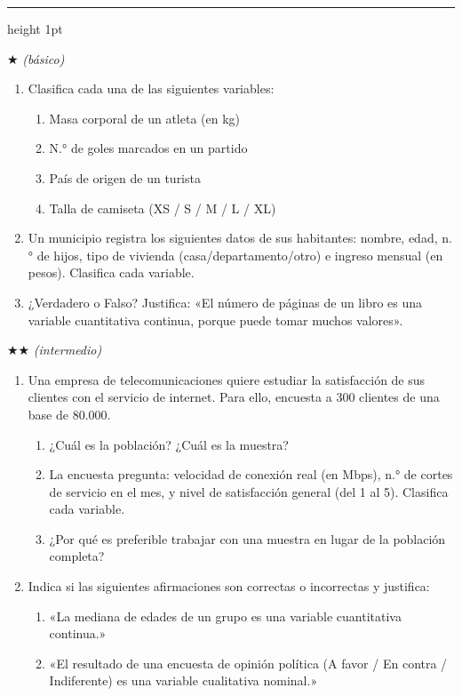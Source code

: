 \documentclass[11pt, letterpaper]{article}
\newcommand{\subbloque}[1]{%
  \vspace{14pt}
  \noindent{\large\bfseries\color{zenitnavy} #1}\par
  \vspace{4pt}\hrule height 1pt\vspace{8pt}}
\begin{document}
\subbloque{Ejercicios propuestos — Sección 1}

$\bigstar$ \textit{(básico)}

\begin{enumerate}[label=\textbf{\arabic*.}, leftmargin=*]
  \item Clasifica cada una de las siguientes variables:
  \begin{enumerate}[label=\alph*)]
    \item Masa corporal de un atleta (en kg)
    \item N.° de goles marcados en un partido
    \item País de origen de un turista
    \item Talla de camiseta (XS / S / M / L / XL)
  \end{enumerate}

  \item Un municipio registra los siguientes datos de sus habitantes: nombre, edad, n.° de hijos, tipo de vivienda (casa/departamento/otro) e ingreso mensual (en pesos). Clasifica cada variable.

  \item ¿Verdadero o Falso? Justifica: «El número de páginas de un libro es una variable cuantitativa continua, porque puede tomar muchos valores».
\end{enumerate}

$\bigstar\bigstar$ \textit{(intermedio)}

\begin{enumerate}[label=\textbf{\arabic*.}, leftmargin=*, resume]
  \item Una empresa de telecomunicaciones quiere estudiar la satisfacción de sus clientes con el servicio de internet. Para ello, encuesta a 300 clientes de una base de 80.000.
  \begin{enumerate}[label=\alph*)]
    \item ¿Cuál es la población? ¿Cuál es la muestra?
    \item La encuesta pregunta: velocidad de conexión real (en Mbps), n.° de cortes de servicio en el mes, y nivel de satisfacción general (del 1 al 5). Clasifica cada variable.
    \item ¿Por qué es preferible trabajar con una muestra en lugar de la población completa?
  \end{enumerate}

  \item Indica si las siguientes afirmaciones son correctas o incorrectas y justifica:
  \begin{enumerate}[label=\alph*)]
    \item «La mediana de edades de un grupo es una variable cuantitativa continua.»
    \item «El resultado de una encuesta de opinión política (A favor / En contra / Indiferente) es una variable cualitativa nominal.»
  \end{enumerate}
\end{enumerate}
\end{document}
